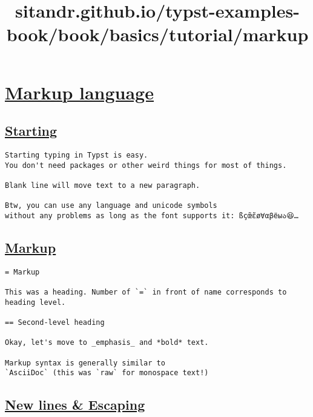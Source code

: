 \title{sitandr.github.io/typst-examples-book/book/basics/tutorial/markup}

\section{\texorpdfstring{\hyperref[markup-language]{Markup
language}}{Markup language}}\label{markup-language}

\subsection{\texorpdfstring{\hyperref[starting]{Starting}}{Starting}}\label{starting}

\begin{verbatim}
Starting typing in Typst is easy.
You don't need packages or other weird things for most of things.

Blank line will move text to a new paragraph.

Btw, you can use any language and unicode symbols
without any problems as long as the font supports it: ßçœ̃ɛ̃ø∀αβёыა😆…
\end{verbatim}

\pandocbounded{}

\subsection{\texorpdfstring{\hyperref[markup]{Markup}}{Markup}}\label{markup}

\begin{verbatim}
= Markup

This was a heading. Number of `=` in front of name corresponds to heading level.

== Second-level heading

Okay, let's move to _emphasis_ and *bold* text.

Markup syntax is generally similar to
`AsciiDoc` (this was `raw` for monospace text!)
\end{verbatim}

\pandocbounded{}

\subsection{\texorpdfstring{\hyperref[new-lines--escaping]{New lines \&
Escaping}}{New lines \& Escaping}}\label{new-lines--escaping}


